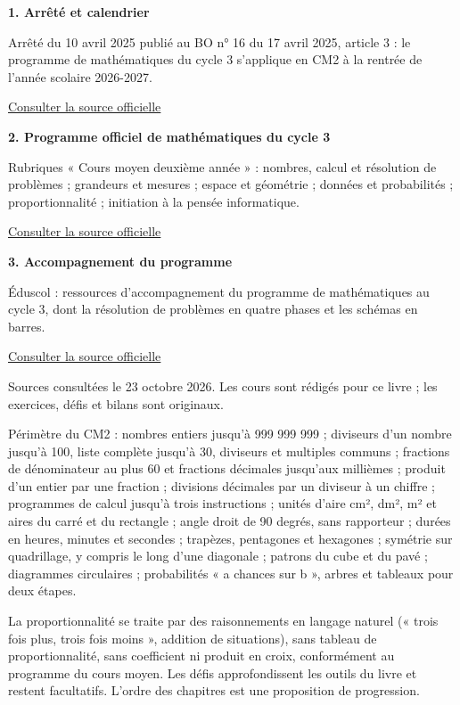 \clearpage\thispagestyle{otFront}\label{references}\fontsize{11}{15}\selectfont
\par\medskip\textbf{1. Arrêté et calendrier}\par Arrêté du 10 avril 2025 publié au BO n° 16 du 17 avril 2025, article 3 : le programme de mathématiques du cycle 3 s’applique en CM2 à la rentrée de l’année scolaire 2026-2027.\par\href{https://www.education.gouv.fr/bo/2025/Hebdo16/MENE2504620A}{\textcolor{otGreenDark}{Consulter la source officielle}}\par
\par\medskip\textbf{2. Programme officiel de mathématiques du cycle 3}\par Rubriques « Cours moyen deuxième année » : nombres, calcul et résolution de problèmes ; grandeurs et mesures ; espace et géométrie ; données et probabilités ; proportionnalité ; initiation à la pensée informatique.\par\href{https://www.education.gouv.fr/sites/default/files/programme-de-math-matiques-pour-le-cycle-3-439827.pdf}{\textcolor{otGreenDark}{Consulter la source officielle}}\par
\par\medskip\textbf{3. Accompagnement du programme}\par Éduscol : ressources d’accompagnement du programme de mathématiques au cycle 3, dont la résolution de problèmes en quatre phases et les schémas en barres.\par\href{https://eduscol.education.gouv.fr/5712/ressources-d-accompagnement-du-programme-de-mathematiques-au-cycle-3}{\textcolor{otGreenDark}{Consulter la source officielle}}\par
\par\bigskip Sources consultées le 23 octobre 2026.
Les cours sont rédigés pour ce livre ; les exercices, défis et bilans
sont originaux.\par\medskip
Périmètre du CM2 : nombres entiers jusqu’à 999 999 999 ; diviseurs
d’un nombre jusqu’à 100, liste complète jusqu’à 30, diviseurs et
multiples communs ; fractions de dénominateur au plus 60 et fractions
décimales jusqu’aux millièmes ; produit d’un entier par une fraction ;
divisions décimales par un diviseur à un chiffre ; programmes de calcul
jusqu’à trois instructions ; unités d’aire cm², dm², m² et aires du carré
et du rectangle ; angle droit de 90 degrés, sans rapporteur ; durées en
heures, minutes et secondes ; trapèzes, pentagones et hexagones ;
symétrie sur quadrillage, y compris le long d’une diagonale ; patrons du
cube et du pavé ; diagrammes circulaires ; probabilités « a chances
sur b », arbres et tableaux pour deux étapes.\par\medskip
La proportionnalité se traite par des raisonnements en langage naturel
(« trois fois plus, trois fois moins », addition de situations), sans
tableau de proportionnalité, sans coefficient ni produit en croix,
conformément au programme du cours moyen. Les défis approfondissent les
outils du livre et restent facultatifs. L’ordre des chapitres est une
proposition de progression.

\clearpage
